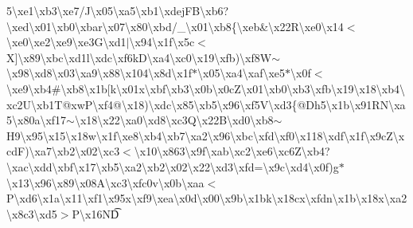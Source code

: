 \begin{DoxyCompactItemize}
5\textbackslash{}xe1\textbackslash{}xb3\textbackslash{}xe7/\+J\textbackslash{}x05\textbackslash{}xa5\textbackslash{}xb1\textbackslash{}xdej\+F\+B\textbackslash{}xb6?\textbackslash{}xed\textbackslash{}x01\textbackslash{}xb0\textbackslash{}xbar\textbackslash{}x07\textbackslash{}x80\textbackslash{}xbd/\+\_\+\textbackslash{}x01\textbackslash{}xb8\{\textbackslash{}xeb\&\textbackslash{}x22\+R\textbackslash{}xe0\textbackslash{}x14$<$\textbackslash{}xe0\textbackslash{}xe2\textbackslash{}xe9\textbackslash{}xe3\+G\textbackslash{}xd1$\vert$\textbackslash{}x94\textbackslash{}x1f\textbackslash{}x5c$<$\+X\mbox{]}\textbackslash{}x89\textbackslash{}xbc\textbackslash{}xd1l\textbackslash{}xdc\textbackslash{}xf6k\+D\textbackslash{}xa4\textbackslash{}xc0\textbackslash{}x19\textbackslash{}xfb)\textbackslash{}xf8\+W$\sim$\textbackslash{}x98\textbackslash{}xd8\textbackslash{}x03\textbackslash{}xa9\textbackslash{}x88\textbackslash{}x104\textbackslash{}x8d\textbackslash{}x1f$\ast$\textbackslash{}x05\textbackslash{}xa4\textbackslash{}xaf\textbackslash{}xe5$\ast$\textbackslash{}x0f$<$\textbackslash{}xe9\textbackslash{}xb4\#\textbackslash{}xb8\textbackslash{}x1b\mbox{[}k\textbackslash{}x01x\textbackslash{}xbf\textbackslash{}xb3\textbackslash{}x0b\textbackslash{}x0c\+Z\textbackslash{}x01\textbackslash{}xb0\textbackslash{}xb3\textbackslash{}xfb\textbackslash{}x19\textbackslash{}x18\textbackslash{}xb4\textbackslash{}xc2\+U\textbackslash{}xb1\+T@xw\+P\textbackslash{}xf4@\textbackslash{}x18)\textbackslash{}xdc\textbackslash{}x85\textbackslash{}xb5\textbackslash{}x96\textbackslash{}xf5\+V\textbackslash{}xd3\{@\+Dh5\textbackslash{}x1b\textbackslash{}x91\textquotesingle{}\+R\+N\textbackslash{}xa5\textbackslash{}x80a\textbackslash{}xf17$\sim$\textbackslash{}x18\textbackslash{}x22\textbackslash{}xa0\textbackslash{}xd8\textbackslash{}xc3\+Q\textbackslash{}x22\+B\textbackslash{}xd0\textbackslash{}xb8$\sim$\+H9\textbackslash{}x95\textbackslash{}x15\textbackslash{}x18w\textbackslash{}x1f\textbackslash{}xe8\textbackslash{}xb4\textbackslash{}xb7\textbackslash{}xa2\textbackslash{}x96\textbackslash{}xbc\textbackslash{}xfd\textbackslash{}xf0\textbackslash{}x118\textbackslash{}xdf\textbackslash{}x1f\textbackslash{}x9c\textquotesingle{}\+Z\textbackslash{}xcd\+F)\textbackslash{}xa7\textbackslash{}xb2\textbackslash{}x02\textbackslash{}xc3$<$\textbackslash{}x10\textbackslash{}x863\textbackslash{}x9f\textbackslash{}xab\textbackslash{}xc2\textbackslash{}xe6\textbackslash{}xc6\+Z\textbackslash{}xb4?\textbackslash{}xac\textbackslash{}xdd\textbackslash{}xbf\textbackslash{}x17\textbackslash{}xb5\textbackslash{}xa2\textbackslash{}xb2\textbackslash{}x02\textbackslash{}x22\textbackslash{}xd3\textbackslash{}xfd=\textbackslash{}x9c\textbackslash{}xd4\textbackslash{}x0f)g$\ast$\textbackslash{}x13\textbackslash{}x96\textbackslash{}x89\textbackslash{}x08\+A\textbackslash{}xc3\textbackslash{}xfc0v\textbackslash{}x0b\textbackslash{}xaa$<$\+P\textbackslash{}xd6\textbackslash{}x1a\textbackslash{}x11\textbackslash{}xf1\textbackslash{}x95x\textbackslash{}xf9\textbackslash{}xea\textbackslash{}x0d\textbackslash{}x00\textbackslash{}x9b\textbackslash{}x1bk\textbackslash{}x18cx\textbackslash{}xfdn\textbackslash{}x1b\textbackslash{}x18x\textbackslash{}xa2\textbackslash{}x8c3\textbackslash{}xd5$>$\+P\textbackslash{}x16\+N\+D\t
\end{DoxyCompactItemize}
